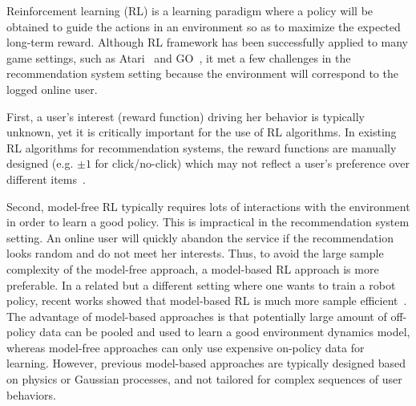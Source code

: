 \documentclass{article} %
\newcommand{\xc}[1]{{\color{blue}{\bf\sf #1}}}
\begin{document}
Reinforcement learning (RL) is a learning paradigm where a policy will be obtained to guide the actions in an environment so as to maximize the expected long-term reward. Although RL framework has been successfully applied to many game settings, such as Atari~\citep{MniKavSilRusetal15} and GO~\citep{SilHuaMadGueetal16}, it met a few challenges in the recommendation system setting because the environment will correspond to the logged online user.

First, a user's interest (reward function) driving her behavior is typically unknown, yet it is critically important for the use of RL algorithms. In existing RL algorithms for recommendation systems, the reward functions are manually designed (e.g. $\pm 1$ for click/no-click) which may not reflect a user's preference over different items~\citep{zhao2018deep,zheng2018drn}. 

Second, model-free RL typically requires lots of interactions with the environment in order to learn a good policy. This is impractical in the recommendation system setting. An online user will quickly abandon the service if the recommendation looks random and do not meet her interests. Thus, to avoid the large sample complexity of the model-free approach, a model-based RL approach is more preferable.
In a related but a different setting where one wants to train a robot policy, recent works showed that model-based RL is much more sample efficient~\citep{NagabandiKahn17, DeisenrothFox15, IgnasiPieter18}. The advantage of model-based approaches is that potentially large amount of off-policy data can be pooled and used to learn a good environment dynamics model, whereas model-free approaches can only use expensive on-policy data for learning. However, previous model-based approaches are typically designed based on physics or Gaussian processes, and not tailored for complex sequences of user behaviors.
\end{document}
